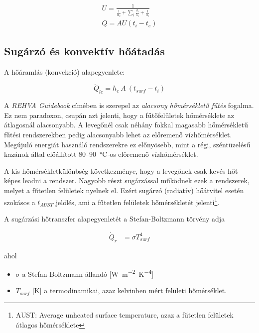 \begin{equation}\label{eq_hoatbcsatas_U}
\begin{aligned}
U = \frac{1}{\frac{1}{\alpha_e}+\sum\limits_{i}^{}\frac{d_i}{\lambda_i}+\frac{1}{\alpha_i}}\\[10pt]
Q = AU(t_i - t_e)
\end{aligned}
\end{equation}

\subsection{Sugárzó és konvektív hőátadás}

A hőáramlás (konvekció) alapegyenlete:

\begin{equation} \label{eq_konvektiv}
\dot Q_{le} = h_c ~ A ~ (t_{surf} - t_i)
\end{equation}


A \textit{REHVA Guidebook} \cite{RehvaGuidebookNo7} címében is szerepel az \textit{alacsony hőmérsékletű fűtés} fogalma. Ez nem paradoxon, csupán azt jelenti, hogy a fűtőfelületek hőmérséklete az átlagosnál alacsonyabb. A levegőnél csak néhány fokkal magasabb hőmérsékletű fűtési rendszerekben pedig alacsonyabb lehet az előremenő vízhőmérséklet. Megújuló energiát használó rendszerekre ez előnyösebb, mint a régi, széntüzelésű kazánok által előállított 80--\SI{90}{\celsius}-os előremenő vízhőmérséklet.

A kis hőmérsékletkülönbség következménye, hogy a levegőnek csak kevés hőt képes leadni a rendszer. Nagyobb részt sugárzással működnek ezek a rendszerek, melyet a fűtetlen felületek nyelnek el. Ezért sugárzó (radiatív) hőátvitel esetén szokásos a $t_{AUST}$ jelölés, ami a fűtetlen felületek hőmérsékletét jelenti\footnote{AUST: Average unheated surface temperature, azaz a fűtetlen felületek átlagos hőmérséklete}.

A sugárzási hőtranszfer alapegyenletét a Stefan-Boltzmann törvény adja


\begin{equation} \label{eq_stefan_boltzmann}
\begin{aligned}
\dot Q_{r} &= \sigma T_{surf}^4
\end{aligned}
\end{equation}

ahol
\begin{itemize}[itemsep=9pt,topsep=0pt,parsep=0pt,partopsep=0pt]
	\item[] $\sigma$ a Stefan-Boltzmann állandó [\si{W~m^{-2}.K^{-4}}] %
	\item[] $T_{surf}$ [\si{\kelvin}] a termodinamikai, azaz kelvinben mért felületi hőmérséklet.
\end{itemize}


